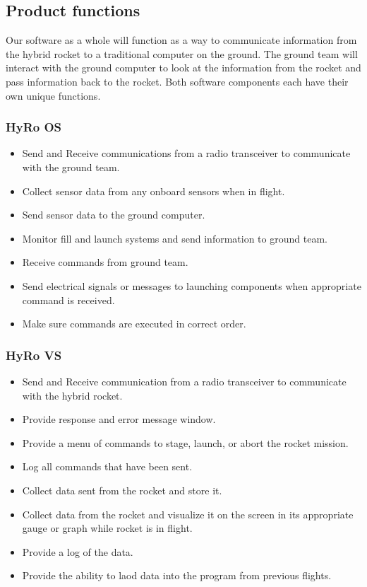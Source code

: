\documentclass[10pt,draftclsnofoot,onecolumn,compsoc]{IEEEtran}
\begin{document}
\subsection{ Product functions}
Our software as a whole will function as a way to communicate information from the hybrid rocket to a traditional computer on the ground. The ground team will interact with the ground computer to look at the information from the rocket and pass information back to the rocket. Both software components each have their own unique functions.

\subsubsection{HyRo OS}
\begin{itemize}
\item Send and Receive communications from a radio transceiver to communicate with the ground team.
\item Collect sensor data from any onboard sensors when in flight.
\item Send sensor data to the ground computer.
\item Monitor fill and launch systems and send information to ground team.
\item Receive commands from ground team.
\item Send electrical signals or messages to launching components when appropriate command is received.
\item Make sure commands are executed in correct order.
\end{itemize}

\subsubsection{HyRo VS}
\begin{itemize}
\item Send and Receive communication from a radio transceiver to communicate with the hybrid rocket.
\item Provide response and error message window.
\item Provide a menu of commands to stage, launch, or abort the rocket mission.
\item Log all commands that have been sent.
\item Collect data sent from the rocket and store it.
\item Collect data from the rocket and visualize it on the screen in its appropriate gauge or graph while rocket is in flight.
\item Provide a log of the data.
\item Provide the ability to laod data into the program from previous flights.
\end{itemize}
\end{document}

